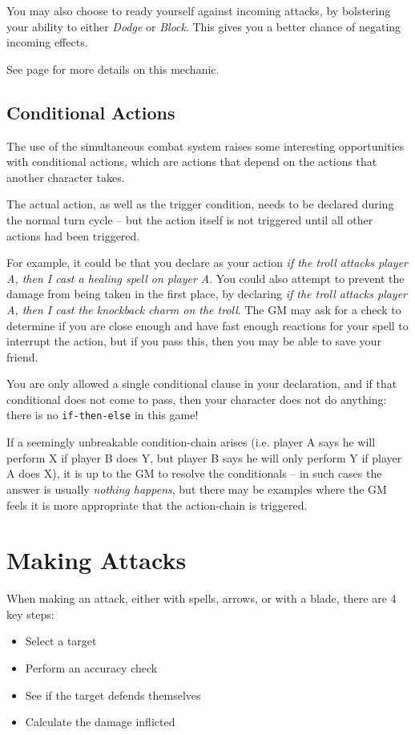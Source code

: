  You may also choose to ready yourself against incoming attacks, by bolstering your ability to either {\it Dodge} or {\it Block}. This gives you a better chance of negating incoming effects.  

See page \pageref{S:Accuracy} for more details on this mechanic. 



\subsection{Conditional Actions}

The use of the simultaneous combat system raises some interesting opportunities with conditional actions, which are actions that depend on the actions that another character takes.

The actual action, as well as the trigger condition, needs to be declared during the normal turn cycle -- but the action itself is not triggered until all other actions had been triggered. 

For example, it could be that you declare as your action \textit{if the troll attacks player A, then I cast a healing spell on player A}. You could also attempt to prevent the damage from being taken in the first place, by declaring \textit{if the troll attacks player A, then I cast the knockback charm on the troll}. The GM may ask for a check to determine if you are close enough and have fast enough reactions for your spell to interrupt the action, but if you pass this, then you may be able to save your friend.

You are only allowed a single conditional clause in your declaration, and if that conditional does not come to pass, then your character does not do anything: there is no \verb|if-then-else| in this game!

If a seemingly unbreakable condition-chain arises (i.e. player A says he will perform X if player B does Y, but player B says he will only perform Y if player A does X), it is up to the GM to resolve the conditionals -- in such cases the answer is usually \textit{nothing happens}, but there may be examples where the GM feels it is more appropriate that the action-chain is triggered. 


\section{Making Attacks}\label{S:Attacks}

When making an attack, either with spells, arrows, or with a blade, there are 4 key steps:
\begin{itemize}
	\item Select a target 
	\item Perform an accuracy check 
	\item See if the target defends themselves
	\item Calculate the damage inflicted
\end{itemize}

